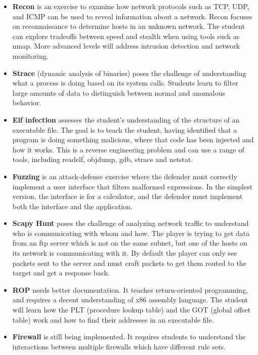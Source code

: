 \documentclass[11pt]{report}
\begin{document}
\begin{itemize}
\item {\bf Recon} is an exercise to examine how network protocols such as TCP, UDP, and ICMP 
can be used to reveal information about a network.  Recon 
focuses on reconnaissance to determine hosts in an unknown network. 
The student can explore tradeoffs between speed and stealth
when using tools such as nmap.
More advanced levels will address intrusion detection and network monitoring.

\item {\bf Strace} (dynamic analysis of binaries) poses the challenge of 
 understanding what
a process is doing based on its system calls.  Students learn to filter large 
amounts of data to distinguish between normal and anomalous behavior.

\item {\bf Elf infection} assesses the student's understanding 
of the structure of an executable file.  The goal is to teach the student, having identified that a program is 
doing something malicious, where that code has been injected and how it works.  This 
is a reverse engineering problem and can use a range of tools, including readelf, objdump, gdb, 
strace and netstat.

\item {\bf Fuzzing} is an attack-defense exercise where the defender must correctly implement a user 
interface that filters malformed expressions.  In the simplest version, the interface is for a 
calculator, and the defender must implement both the interface and the application.  

\item {\bf Scapy Hunt} poses the challenge of analyzing network traffic 
to understand who is communicating with whom and how. The player is trying to get data from an ftp server
which is not on the same subnet, but one of the hosts on its network is communicating with it.
By default the player can only see packets sent to the server and must craft packets to get them routed
to the target and get a response back.

\item {\bf ROP} needs better documentation.  It teaches return-oriented programming, and requires
a decent understanding of x86 assembly language.  The student
will learn how the PLT (procedure lookup table) and the GOT (global offset table) work
and how to find their addresses in an executable file.


\item {\bf Firewall} is still being implemented.  It requires students to understand the 
interactions between multiple firewalls which have different rule sets.


\end{itemize}
\end{document}
